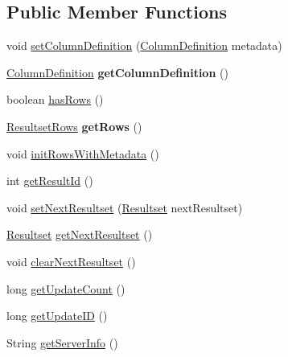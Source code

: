 \subsection*{Public Member Functions}
\begin{DoxyCompactItemize}
\item 
void \mbox{\hyperlink{interfacecom_1_1mysql_1_1cj_1_1protocol_1_1_resultset_aee8797446404a63565e56825f2b5a5d4}{set\+Column\+Definition}} (\mbox{\hyperlink{interfacecom_1_1mysql_1_1cj_1_1protocol_1_1_column_definition}{Column\+Definition}} metadata)
\item 
\mbox{\label{interfacecom_1_1mysql_1_1cj_1_1protocol_1_1_resultset_aa09b585b364b09f418b47bd267b1758b}} 
\mbox{\hyperlink{interfacecom_1_1mysql_1_1cj_1_1protocol_1_1_column_definition}{Column\+Definition}} {\bfseries get\+Column\+Definition} ()
\item 
boolean \mbox{\hyperlink{interfacecom_1_1mysql_1_1cj_1_1protocol_1_1_resultset_acafe4b216e2086884d0758c64fd34c0b}{has\+Rows}} ()
\item 
\mbox{\label{interfacecom_1_1mysql_1_1cj_1_1protocol_1_1_resultset_a56ff0f26904a612a034bf839cae46d51}} 
\mbox{\hyperlink{interfacecom_1_1mysql_1_1cj_1_1protocol_1_1_resultset_rows}{Resultset\+Rows}} {\bfseries get\+Rows} ()
\item 
void \mbox{\hyperlink{interfacecom_1_1mysql_1_1cj_1_1protocol_1_1_resultset_a2ee6b6a8cb5164dfc293b23cefb96b46}{init\+Rows\+With\+Metadata}} ()
\item 
int \mbox{\hyperlink{interfacecom_1_1mysql_1_1cj_1_1protocol_1_1_resultset_a77886132904378ea915db2b4803e588c}{get\+Result\+Id}} ()
\item 
void \mbox{\hyperlink{interfacecom_1_1mysql_1_1cj_1_1protocol_1_1_resultset_a030e08e421f62239d808fc1be2808ac4}{set\+Next\+Resultset}} (\mbox{\hyperlink{interfacecom_1_1mysql_1_1cj_1_1protocol_1_1_resultset}{Resultset}} next\+Resultset)
\item 
\mbox{\hyperlink{interfacecom_1_1mysql_1_1cj_1_1protocol_1_1_resultset}{Resultset}} \mbox{\hyperlink{interfacecom_1_1mysql_1_1cj_1_1protocol_1_1_resultset_aeb71f17cb0bbc2c33b47bc7e6a1f750c}{get\+Next\+Resultset}} ()
\item 
void \mbox{\hyperlink{interfacecom_1_1mysql_1_1cj_1_1protocol_1_1_resultset_ab66d8aa07fe7c7860c0852a7a10f4e27}{clear\+Next\+Resultset}} ()
\item 
long \mbox{\hyperlink{interfacecom_1_1mysql_1_1cj_1_1protocol_1_1_resultset_a72a3e90cf2affd2bbc8826a2c2e39df9}{get\+Update\+Count}} ()
\item 
long \mbox{\hyperlink{interfacecom_1_1mysql_1_1cj_1_1protocol_1_1_resultset_ab9b9750b3d8a9d8cc35af6d1e59dd86f}{get\+Update\+ID}} ()
\item 
String \mbox{\hyperlink{interfacecom_1_1mysql_1_1cj_1_1protocol_1_1_resultset_a41ec899fbc6875d7b31245be7245ae9a}{get\+Server\+Info}} ()
\end{DoxyCompactItemize}


